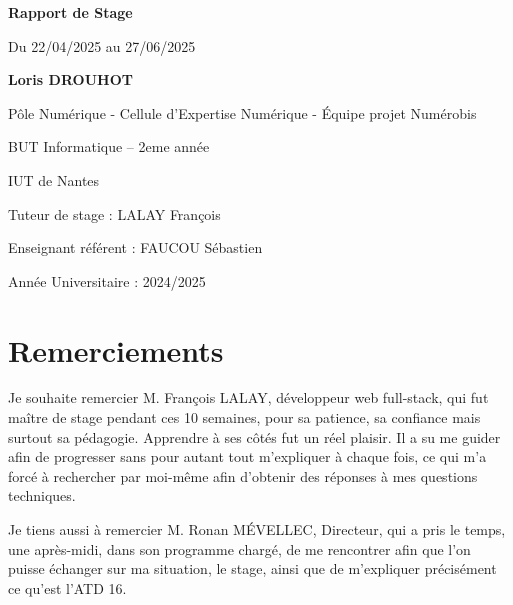 \documentclass[a4paper,12pt]{report}
\begin{document}
\begin{titlepage}
    \vspace{3cm}

    \centering
    {\Huge \textbf{Rapport de Stage} \par}
    \vspace{0.5em}
    {\small Du 22/04/2025 au 27/06/2025}
    \vspace{1.5cm}

    {\Large \textbf{Loris DROUHOT} \par}
    \vspace{0.5cm}
    {\large Pôle Numérique - Cellule d'Expertise Numérique - Équipe projet Numérobis \par}

    {\large BUT Informatique – 2eme année \par}
    {\large IUT de Nantes\par}
    \vspace{2cm}

    \vfill
    {\large Tuteur de stage : LALAY François \par}
    {\large Enseignant référent : FAUCOU Sébastien \par}
    \vspace{1em}
    {\large Année Universitaire : 2024/2025 \par}
    
\end{titlepage}

\newpage
\thispagestyle{empty}

\chapter*{Remerciements}

Je souhaite remercier M. François LALAY, développeur web full-stack, qui fut maître de stage pendant ces 10 semaines, pour sa patience, sa confiance mais surtout sa pédagogie. Apprendre à ses côtés fut un réel plaisir. Il a su me guider afin de progresser sans pour autant tout m'expliquer à chaque fois, ce qui m’a forcé à rechercher par moi-même afin d’obtenir des réponses à mes questions techniques.

\vspace{1em}

Je tiens aussi à remercier M. Ronan MÉVELLEC, Directeur, qui a pris le temps, une après-midi, dans son programme chargé, de me rencontrer afin que l’on puisse échanger sur ma situation, le stage, ainsi que de m’expliquer précisément ce qu'est l’ATD 16.
\end{document}
